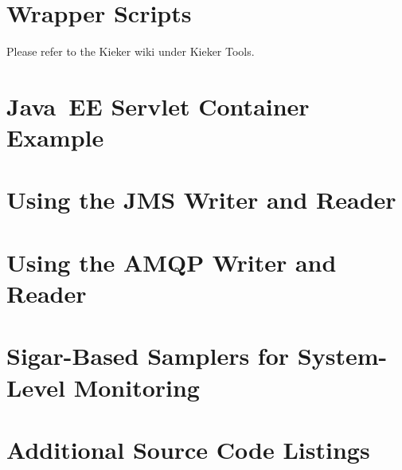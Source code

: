% 

\newpage
\appendix

{}
\hypertarget{hypertarget:appendix}{}

\chapter{Wrapper Scripts}\label{appendix:wrapperScripts}
Please refer to the Kieker wiki under Kieker Tools.

\chapter{Java~EE Servlet Container Example}\label{appendix:JavaEEServletExample}


\chapter{Using the JMS Writer and Reader}\label{appendix:usingJMS}


\chapter{Using the AMQP Writer and Reader}\label{appendix:usingAMQP}


\chapter{Sigar-Based Samplers for System-Level Monitoring}\label{appendix:SigarBasedSamplers}


%

\chapter{Additional Source Code Listings}\label{appendix:additionalSourceCode}


